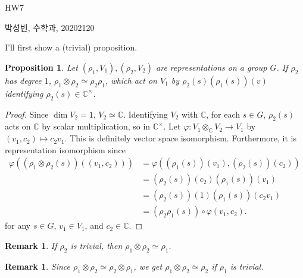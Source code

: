 \documentclass[a4paper, 12pt]{article}
\theoremstyle{Mydefinition}
\newtheorem{remark}[statement]{Remark}
\theoremstyle{Mytheorem}
\newtheorem{proposition}[statement]{Proposition}
\begin{document}
\thispagestyle{myfirstpage}
\begin{center}
	\Large{HW7}
\end{center}
박성빈, 수학과, 20202120

I'll first show a (trivial) proposition.
\begin{proposition}
Let $(\rho_1, V_1), (\rho_2, V_2)$ are representations on a group $G$. If $\rho_2$ has degree $1$, $\rho_1\otimes \rho_2\simeq \rho_2\rho_1$, which act on $V_1$ by $\rho_2(s)\left(\rho_1(s)\right)(v)$ identifying $\rho_2(s)\in\mathbb{C}^\times$.
\end{proposition}
\begin{proof}
Since $\dim V_2 = 1$, $V_2\simeq \mathbb{C}$. Identifying $V_2$ with $\mathbb{C}$, for each $s\in G$, $\rho_2(s)$ acts on $\mathbb{C}$ by scalar multiplication, so in $\mathbb{C}^\times$. Let $\varphi:V_1\otimes_{\mathbb{C}}V_2\rightarrow V_1$ by $(v_1,c_2)\mapsto c_2v_1$. This is definitely vector space isomorphism. Furthermore, it is representation isomorphism since
\begin{equation}
\begin{split}
    \varphi\left(\left(\rho_1\otimes \rho_2(s)\right)((v_1, c_2))\right) &= \varphi\left(\left(\rho_1(s)\right)(v_1), \left(\rho_2(s)\right)(c_2)\right) \\
    &= \left(\rho_2(s)\right)(c_2)\left(\rho_1(s)\right)(v_1)\\
    &=\left(\rho_2(s)\right)(1)\left(\rho_1(s)\right)(c_2v_1)\\
    &=\left(\rho_2\rho_1(s)\right)\circ \varphi(v_1, c_2).
\end{split}
\end{equation}
for any $s\in G$, $v_1\in V_1$, and $c_2\in \mathbb{C}$.
\end{proof}
\begin{remark}
If $\rho_2$ is trivial, then $\rho_1\otimes \rho_2\simeq \rho_1$.
\end{remark}
\begin{remark}
Since $\rho_1\otimes \rho_2 \simeq \rho_2\otimes \rho_1$, we get $\rho_1\otimes \rho_2\simeq \rho_2$ if $\rho_1$ is trivial.
\end{remark}
\end{document}
